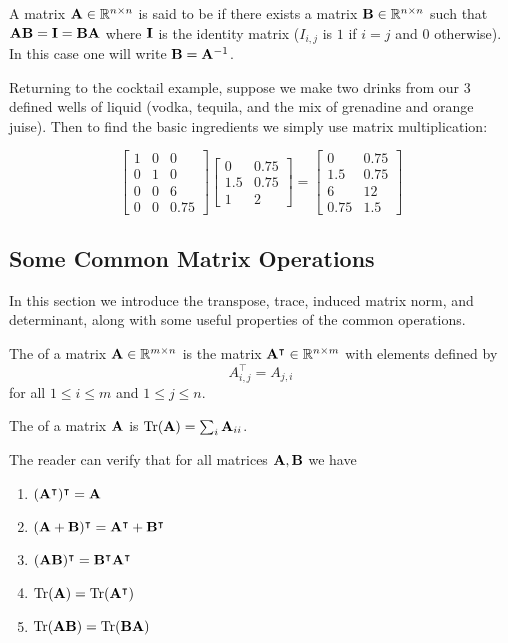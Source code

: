 A matrix $\MA\in\R^{n\times n}$ is said to be  if there exists a matrix $\MB\in\R^{n\times n}$ such that $\MA\MB = \MI = \MB\MA$ where $\MI$ is the identity matrix ($I_{i,j}$ is $1$ if $i=j$ and $0$ otherwise). In this case one will write $\MB = \MA^{-1}$.

\begin{example}
Returning to the cocktail example, suppose we make two drinks from our 3 defined wells of liquid (vodka, tequila, and the mix of grenadine and orange juise). Then to find the basic ingredients we simply use matrix multiplication: 

$$ \begin{bmatrix}
1 & 0 & 0 \\
0 & 1 & 0 \\
0 & 0 & 6 \\
0 & 0 & 0.75
\end{bmatrix}\begin{bmatrix}
0 & 0.75 \\
1.5 & 0.75 \\
1 & 2 
\end{bmatrix} = \begin{bmatrix}
0 & 0.75 \\
1.5 & 0.75 \\
6 & 12 \\
0.75 & 1.5
\end{bmatrix}$$
\end{example}

\subsection{Some Common Matrix Operations} 

In this section we introduce the transpose, trace, induced matrix norm, and determinant, along with some useful properties of the common operations.

\begin{definition}\label{trans-def}
The  of a matrix $\MA \in \mathbb R^{m \times n}$ is the matrix $\MA^\intercal \in \mathbb R^{n\times m}$ with elements defined by 
$$A^\intercal_{i,j} = A_{j,i}$$ 
for all $1\leq i\leq m$ and $1\leq j\leq n$.
\end{definition}

\begin{definition}
The  of a matrix $\MA$ is $\trace(\MA) = \sum_i \MA_{ii}$.
\end{definition}

The reader can verify that for all matrices $\MA,\MB$ we have
\begin{enumerate}
    \item $(\MA^\intercal)^\intercal = \MA$
    \item $(\MA + \MB)^\intercal = \MA^\intercal + \MB^\intercal$
    \item $(\MA\MB)^\intercal = \MB^\intercal \MA^\intercal$
    \item $\trace(\MA) = \trace(\MA^\intercal)$
    \item $\trace(\MA\MB) = \trace(\MB\MA)$
\end{enumerate}

